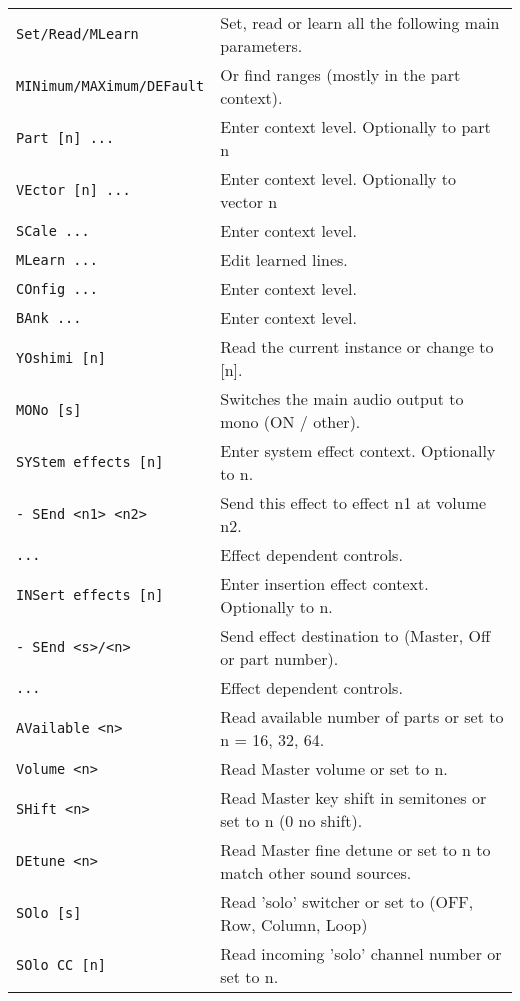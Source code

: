 \begin{center}
\begin{longtable}{p{6cm} p{10cm}}
\texttt{Set/Read/MLearn} &
   Set, read or learn all the following main parameters. \\
\texttt{MINimum/MAXimum/DEFault} &
   Or find ranges (mostly in the part context). \\
   \texttt{Part [n] ...} &
   Enter context level. Optionally to part n\\
\texttt{VEctor [n] ...} &
   Enter context level. Optionally to vector n\\
\texttt{SCale ...} &
   Enter context level. \\
\texttt{MLearn ...} &
   Edit learned lines. \\
\texttt{COnfig ...} &
   Enter context level. \\
\texttt{BAnk ...} &
   Enter context level. \\


\texttt{YOshimi [n]} &
   Read the current instance or change to [n]. \\
\texttt{MONo [s]} &
   Switches the main audio output to mono (ON / other). \\

\texttt{SYStem effects [n]} &
   Enter system effect context. Optionally to n. \\
\texttt{- SEnd <n1> <n2>} &
   Send this effect to effect n1 at volume n2. \\
\texttt{...} &
   Effect dependent controls. \\
\texttt{INSert effects [n]} &
   Enter insertion effect context. Optionally to n. \\
\texttt{- SEnd <s>/<n>} &
   Send effect destination to (Master, Off or part number). \\
\texttt{...} &
   Effect dependent controls. \\

\texttt{AVailable <n>} &
   Read available number of parts or set to n = 16, 32, 64. \\
\texttt{Volume <n>} &
   Read Master volume or set to n. \\
\texttt{SHift <n>} &
   Read Master key shift in semitones or set to n (0 no shift). \\
\texttt{DEtune <n>} &
   Read Master fine detune or set to n to match other sound sources. \\
\texttt{SOlo [s]} &
   Read 'solo' switcher or set to (OFF, Row, Column, Loop) \\
\texttt{SOlo CC [n]} &
   Read incoming 'solo' channel number or set to n. \\

\end{longtable}
\end{center}

